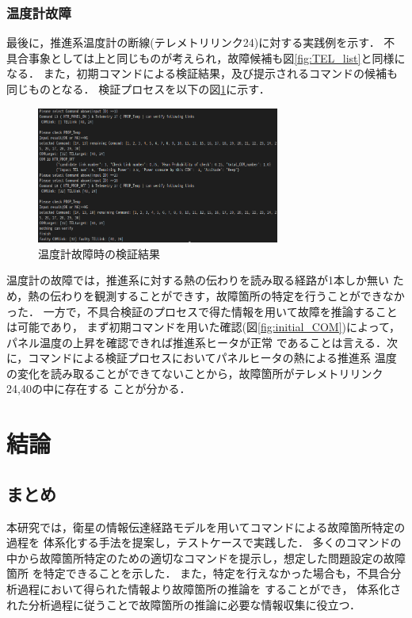 \documentclass[11pt]{jsarticle}%
\begin{document}
\begin{multicols}{2}
\subsubsection{温度計故障}
最後に，推進系温度計の断線(テレメトリリンク24)に対する実践例を示す．
不具合事象としては上と同じものが考えられ，故障候補も図\ref{fig:TEL_list}と同様になる．
また，初期コマンドによる検証結果，及び提示されるコマンドの候補も同じものとなる．
検証プロセスを以下の図\ref{fig:COM_phase_TS}に示す．
\begin{figure}[H]
  \centering
    \includegraphics[width=8.0cm]{../figure/COM14_TEL17_COM_COM_13start_mode2.png}
    \caption{温度計故障時の検証結果}
    \label{fig:COM_phase_TS}
\end{figure}
温度計の故障では，推進系に対する熱の伝わりを読み取る経路が1本しか無い
ため，熱の伝わりを観測することができす，故障箇所の特定を行うことができなかった．
一方で，不具合検証のプロセスで得た情報を用いて故障を推論することは可能であり，
まず初期コマンドを用いた確認(図\ref{fig:initial_COM})によって，
パネル温度の上昇を確認できれば推進系ヒータが正常
であることは言える．次に，コマンドによる検証プロセスにおいてパネルヒータの熱による推進系
温度の変化を読み取ることができてないことから，故障箇所がテレメトリリンク24,40の中に存在する
ことが分かる．

\section{結論}
\vspace{-1zh}
\subsection{まとめ}
\vspace{-1zh} %
本研究では，衛星の情報伝達経路モデルを用いてコマンドによる故障箇所特定の過程を
体系化する手法を提案し，テストケースで実践した．
多くのコマンドの中から故障箇所特定のための適切なコマンドを提示し，想定した問題設定の故障箇所
を特定できることを示した．
また，特定を行えなかった場合も，不具合分析過程において得られた情報より故障箇所の推論を
することができ，
体系化された分析過程に従うことで故障箇所の推論に必要な情報収集に役立つ．


\end{multicols}
\end{document}
